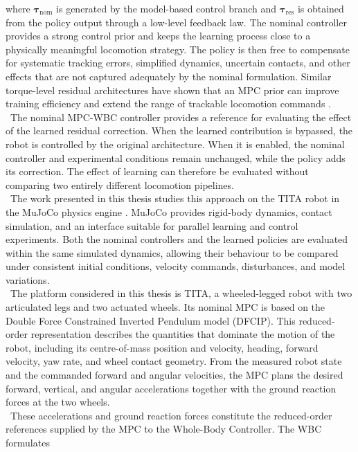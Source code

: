 where \(\boldsymbol{\tau}_{\mathrm{nom}}\) is generated by the model-based
control branch and \(\boldsymbol{\tau}_{\mathrm{res}}\) is obtained from the
policy output through a low-level feedback law. The nominal controller provides
a strong control prior and keeps the learning process close to a physically
meaningful locomotion strategy. The policy is then free to compensate for
systematic tracking errors, simplified dynamics, uncertain contacts, and other
effects that are not captured adequately by the nominal formulation. Similar
torque-level residual architectures have shown that an MPC prior can improve
training efficiency and extend the range of trackable locomotion commands
\cite{residual_mpc}.\\
\
The nominal MPC-WBC controller provides a reference for evaluating the effect
of the learned residual correction. When the
learned contribution is bypassed, the robot is controlled by the original architecture. 
When it is enabled, the nominal controller and
experimental conditions remain unchanged, while the policy adds its correction.
The effect of learning can therefore be evaluated without comparing two
entirely different locomotion pipelines.\\
\
The work presented in this thesis studies this approach on the TITA robot
in the MuJoCo physics engine \cite{mujoco}. MuJoCo provides
rigid-body dynamics, contact simulation, and an interface suitable for parallel
learning and control experiments. Both the nominal controllers and the learned
policies are evaluated within the same simulated dynamics, allowing their
behaviour to be compared under consistent initial conditions, velocity
commands, disturbances, and model variations.\\
\
The platform considered in this thesis is TITA, a wheeled-legged robot with two
articulated legs and two actuated wheels. Its nominal MPC is based on the Double Force
Constrained Inverted Pendulum model (DFCIP). This reduced-order
representation describes the quantities that dominate the motion of the robot,
including its centre-of-mass position and velocity, heading, forward velocity,
yaw rate, and wheel contact geometry. From the measured robot state and the
commanded forward and angular velocities, the MPC plans the desired forward,
vertical, and angular accelerations together with the ground reaction forces at
the two wheels.\\
\
These accelerations and ground reaction forces constitute the reduced-order
references supplied by the MPC to the Whole-Body Controller. The WBC formulates
